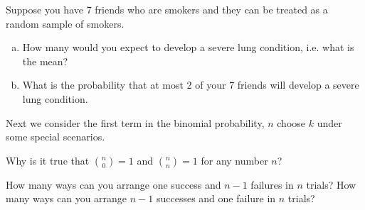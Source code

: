 \begin{exercisewrap}
\begin{nexercise}
Suppose you have 7 friends who are smokers and they can
be treated as a random sample of smokers.\footnotemark{}
\begin{enumerate}[(a)]
\setlength{\itemsep}{0mm}
\item
    How many would you expect to develop a severe lung
    condition, i.e. what is the mean?
\item
    What is the probability that at most 2 of your 7
    friends will develop a severe lung condition.
\end{enumerate}
\end{nexercise}
\end{exercisewrap}

Next we consider the first term in the binomial probability,
$n$ choose $k$ under some special scenarios.

\begin{exercisewrap}
\begin{nexercise}
Why is it true that ${n \choose 0}=1$ and ${n \choose n}=1$
for any number $n$?\footnotemark{}
\end{nexercise}
\end{exercisewrap}

\begin{exercisewrap}
\begin{nexercise}
How many ways can you arrange one success and $n-1$ failures
in $n$ trials?
How many ways can you arrange $n-1$ successes and one failure
in $n$ trials?\footnotemark{}
\end{nexercise}
\end{exercisewrap}


